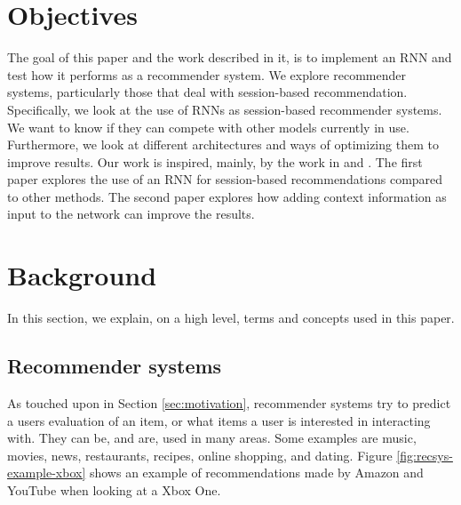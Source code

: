 \section{Objectives}
The goal of this paper and the work described in it, is to implement an RNN and test how it performs as a recommender system. We explore recommender systems, particularly those that deal with session-based recommendation. Specifically, we look at the use of RNNs as session-based recommender systems. We want to know if they can compete with other models currently in use. Furthermore, we look at different architectures and ways of optimizing them to improve results. Our work is inspired, mainly, by the work in \cite{DBLP:journals/corr/HidasiKBT15} and \cite{DBLP:journals/corr/LiuWWL016}. The first paper explores the use of an RNN for session-based recommendations compared to other methods. The second paper explores how adding context information as input to the network can improve the results.





\section{Background}
In this section, we explain, on a high level, terms and concepts used in this paper.

\subsection{Recommender systems}
As touched upon in Section \ref{sec:motivation}, recommender systems try to predict a users evaluation of an item, or what items a user is interested in interacting with. They can be, and are, used in many areas. Some examples are music, movies, news, restaurants, recipes, online shopping, and dating. Figure \ref{fig:recsys-example-xbox} shows an example of recommendations made by Amazon and YouTube when looking at a Xbox One.
	
